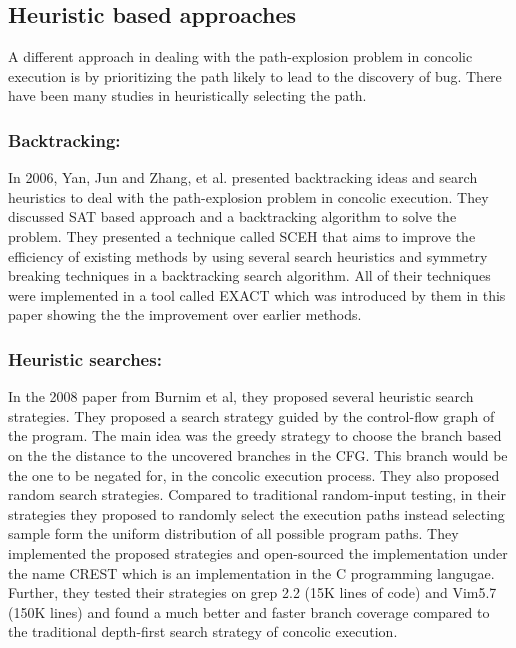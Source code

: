 \documentclass[	runningheads,
				a4paper]{llncs}
\begin{document}

\subsection{Heuristic based approaches}
A different approach in dealing with the path-explosion problem in concolic execution is by prioritizing the path likely to lead to the discovery of bug. There have been many studies in heuristically selecting the path. 

\subsubsection{Backtracking:}
In 2006, Yan, Jun and Zhang, et al. presented \cite{yan2006backtracking} backtracking ideas and search heuristics to deal with the path-explosion problem in concolic execution. They discussed SAT based approach and a backtracking algorithm to solve the problem. They presented a technique called SCEH that aims to improve the efficiency of existing methods by using several search heuristics and symmetry breaking techniques in a backtracking search algorithm. All of their techniques were implemented in a tool called EXACT which was introduced by them in this paper showing the the improvement over earlier methods.

\subsubsection{Heuristic searches:}
In the 2008 paper \cite{kousik2008heuristic} from Burnim et al, they proposed several heuristic search strategies. They proposed a search strategy guided by the control-flow graph of the program. The main idea was the greedy strategy to choose the branch based on the the distance to the uncovered branches in the CFG. This branch would be the one to be negated for, in the concolic execution process. They also proposed random search strategies. Compared to traditional random-input testing, in their strategies they proposed to randomly select the execution paths instead selecting sample form the uniform distribution of all possible program paths. They implemented the proposed strategies and open-sourced the implementation under the name CREST which is an implementation in the C programming langugae. Further, they tested their strategies on grep 2.2 (15K lines of code) and Vim5.7 (150K lines) and found a much better and faster branch coverage compared to the traditional depth-first search strategy of concolic execution. 
\end{document}
